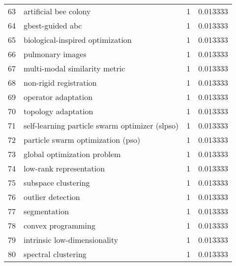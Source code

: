 \begin{tabular}{llrr}
63 &                           artificial bee colony &           1 &    0.013333 \\
64 &                                gbest-guided abc &           1 &    0.013333 \\
65 &                biological-inspired optimization &           1 &    0.013333 \\
66 &                                pulmonary images &           1 &    0.013333 \\
67 &                   multi-modal similarity metric &           1 &    0.013333 \\
68 &                          non-rigid registration &           1 &    0.013333 \\
69 &                             operator adaptation &           1 &    0.013333 \\
70 &                             topology adaptation &           1 &    0.013333 \\
71 &  self-learning particle swarm optimizer (slpso) &           1 &    0.013333 \\
72 &               particle swarm optimization (pso) &           1 &    0.013333 \\
73 &                     global optimization problem &           1 &    0.013333 \\
74 &                         low-rank representation &           1 &    0.013333 \\
75 &                             subspace clustering &           1 &    0.013333 \\
76 &                               outlier detection &           1 &    0.013333 \\
77 &                                    segmentation &           1 &    0.013333 \\
78 &                              convex programming &           1 &    0.013333 \\
79 &                    intrinsic low-dimensionality &           1 &    0.013333 \\
80 &                             spectral clustering &           1 &    0.013333 \\
\bottomrule
\end{tabular}
